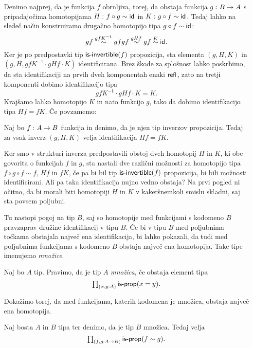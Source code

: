 Denimo najprej, da je funkcija \(f\) obrnljiva, torej, da obstaja funkcija \(g \,\colon B \to A\) s pripadajočima homotopijama \(H \,\colon f \circ g \sim \textnormal{\textsf{id}}_{}\) in \(K \,\colon g \circ f \sim \textnormal{\textsf{id}}_{}\). Tedaj lahko na sledeč način konstruiramo drugačno homotopijo tipa \(g \circ f \sim \textnormal{\textsf{id}}_{}\):
\[gf \overset{gfK^{-1}}{\sim} gfgf \overset{gHf}{\sim} gf \overset{K}{\sim} \textnormal{\textsf{id}}_{}.\]
Ker je po predpostavki tip \(\textnormal{\textsf{is-invertible}}(f)\) propozicija, sta elementa \((g, H, K)\)
in \((g, H, gfK^{-1} \cdot gHf \cdot K)\) identificirana. Brez škode za splošnost lahko poskrbimo, da sta identifikaciji na prvih dveh komponentah enaki \(\textnormal{\textsf{refl}}_{}\), zato na tretji komponenti dobimo identifikacijo tipa \[gfK^{-1} \cdot gHf \cdot K = K.\]
Krajšamo lahko homotopijo \(K\) in nato funkcijo \(g\), tako da dobimo identifikacijo tipa \(Hf = fK\). Če povzamemo:

\begin{trditev}
  \label{inv-prop-coherence}
  Naj bo \(f \,\colon A \to B\) funkcija in denimo, da je njen tip inverzov propozicija. Tedaj za vsak inverz \((g, H, K)\) velja identifikacija \(Hf = fK\).
\end{trditev}


Ker smo v strukturi inverza predpostavili obstoj dveh homotopij \(H\) in \(K\), ki obe govorita o funkcijah \(f\) in \(g\), sta nastali dve različni možnosti za homotopijo tipa \(f \circ g \circ f \sim f\), \(Hf\) in \(fK\), če pa bi bil tip \(\textnormal{\textsf{is-invertible}}(f)\) propozicija, bi bili možnosti identificirani. Ali pa taka identifikacija nujno vedno obstaja? Na prvi pogled ni očitno, da bi morali biti homotopiji \(H\) in \(K\) v kakeršnemkoli smislu skladni, saj sta povsem poljubni.

Tu nastopi pogoj na tip \(B\), saj so homotopije med funkcijami s kodomeno \(B\) pravzaprav družine identifikacij v tipu \(B\). Če bi v tipu \(B\) med poljubnima točkama obstajala največ ena identifikacija, bi lahko pokazali, da tudi med poljubnima funkcijama s kodomeno \(B\) obstaja največ ena homotopija. Take tipe imenujemo \emph{množice}.

\begin{definicija}
  Naj bo \(A\) tip. Pravimo, da je tip \(A\) \emph{množica}, če obstaja element tipa
  \[\textstyle \prod_{\left( x, y : A \right)} \textnormal{\textsf{is-prop}}(x = y).\]
\end{definicija}

Dokažimo torej, da med funkcijama, katerih kodomena je množica, obstaja največ ena homotopija.

\begin{trditev}
  \label{is-prop-htpy-set}
  Naj bosta \(A\) in \(B\) tipa ter denimo, da je tip \(B\) množica. Tedaj velja
  \[\textstyle \prod_{\left( f, g : A \to B \right)} \textnormal{\textsf{is-prop}}(f \sim g).\]
\end{trditev}

